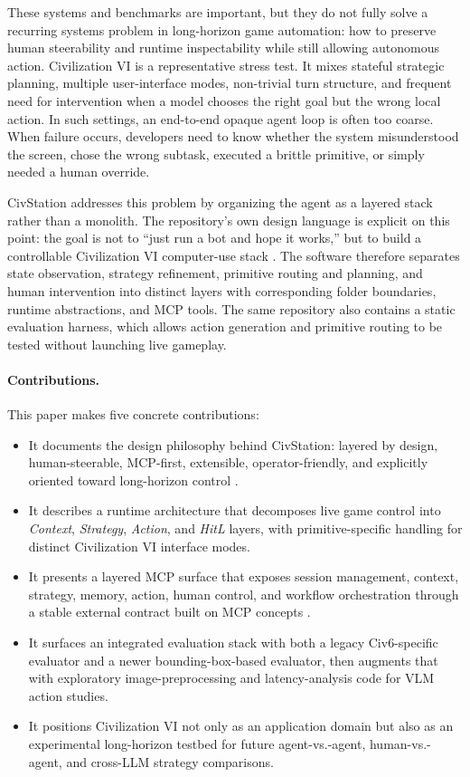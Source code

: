 These systems and benchmarks are important, but they do not fully solve a recurring systems problem in long-horizon game automation: how to preserve human steerability and runtime inspectability while still allowing autonomous action. Civilization VI is a representative stress test. It mixes stateful strategic planning, multiple user-interface modes, non-trivial turn structure, and frequent need for intervention when a model chooses the right goal but the wrong local action. In such settings, an end-to-end opaque agent loop is often too coarse. When failure occurs, developers need to know whether the system misunderstood the screen, chose the wrong subtask, executed a brittle primitive, or simply needed a human override.

CivStation addresses this problem by organizing the agent as a layered stack rather than a monolith. The repository's own design language is explicit on this point: the goal is not to ``just run a bot and hope it works,'' but to build a controllable Civilization VI computer-use stack \cite{civstation_repo}. The software therefore separates state observation, strategy refinement, primitive routing and planning, and human intervention into distinct layers with corresponding folder boundaries, runtime abstractions, and MCP tools. The same repository also contains a static evaluation harness, which allows action generation and primitive routing to be tested without launching live gameplay.

\paragraph{Contributions.}
This paper makes five concrete contributions:
\begin{itemize}[leftmargin=*]
    \item It documents the design philosophy behind CivStation: layered by design, human-steerable, MCP-first, extensible, operator-friendly, and explicitly oriented toward long-horizon control \cite{civstation_repo}.
    \item It describes a runtime architecture that decomposes live game control into \emph{Context}, \emph{Strategy}, \emph{Action}, and \emph{HitL} layers, with primitive-specific handling for distinct Civilization VI interface modes.
    \item It presents a layered MCP surface that exposes session management, context, strategy, memory, action, human control, and workflow orchestration through a stable external contract built on MCP concepts \cite{mcp_architecture}.
    \item It surfaces an integrated evaluation stack with both a legacy Civ6-specific evaluator and a newer bounding-box-based evaluator, then augments that with exploratory image-preprocessing and latency-analysis code for VLM action studies.
    \item It positions Civilization VI not only as an application domain but also as an experimental long-horizon testbed for future agent-vs.-agent, human-vs.-agent, and cross-LLM strategy comparisons.
\end{itemize}

